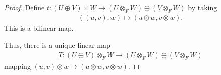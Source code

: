 \documentclass[10pt]{mypackage}
\begin{document}
  \begin{proof}
    Define $t: \left(U\oplus V\right)\times W \rightarrow \left(U\otimes_{F} W\right)\oplus \left(V\otimes_{F}W\right)$ by taking
    \begin{align*}
      \left(\left(u,v\right),w\right)\mapsto \left(u\otimes w,v\otimes w\right).
    \end{align*}
    This is a bilinear map.\newline

    Thus, there is a unique linear map
    \begin{align*}
      T: \left(U\oplus V\right)\otimes_{F} W \rightarrow \left(U\otimes_{F}W\right)\oplus \left(V\otimes_{F}W\right)
    \end{align*}
    mapping $\left(u,v\right)\otimes w \mapsto \left(u\otimes w,v\otimes w\right)$.\newline


\end{proof}
\end{document}
